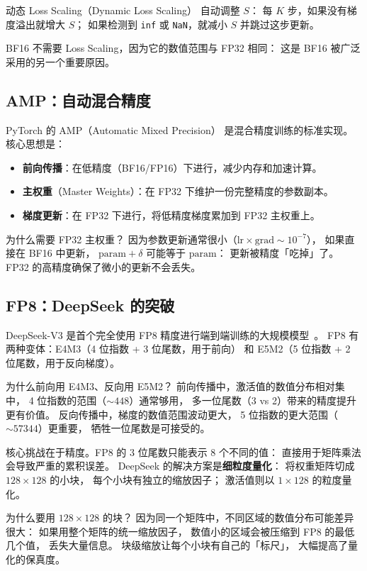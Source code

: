 动态 Loss Scaling（Dynamic Loss Scaling）
自动调整 $S$：
每 $K$ 步，如果没有梯度溢出就增大 $S$；
如果检测到 \texttt{inf} 或 \texttt{NaN}，就减小 $S$ 并跳过这步更新。

BF16 不需要 Loss Scaling，因为它的数值范围与 FP32 相同：
这是 BF16 被广泛采用的另一个重要原因。

\subsection{AMP：自动混合精度}

PyTorch 的 AMP（Automatic Mixed Precision）
是混合精度训练的标准实现。
核心思想是：
\begin{itemize}[noitemsep]
  \item \textbf{前向传播}：在低精度（BF16/FP16）下进行，减少内存和加速计算。
  \item \textbf{主权重}（Master Weights）：在 FP32 下维护一份完整精度的参数副本。
  \item \textbf{梯度更新}：在 FP32 下进行，将低精度梯度累加到 FP32 主权重上。
\end{itemize}

为什么需要 FP32 主权重？
因为参数更新通常很小（$\mathrm{lr} \times \mathrm{grad} \sim 10^{-7}$），
如果直接在 BF16 中更新，
$\mathrm{param} + \delta$ 可能等于 $\mathrm{param}$：
更新被精度「吃掉」了。
FP32 的高精度确保了微小的更新不会丢失。

\subsection{FP8：DeepSeek 的突破}

DeepSeek-V3 是首个完全使用 FP8 精度进行端到端训练的大规模模型~\cite{deepseekv3}。
FP8 有两种变体：E4M3（4 位指数 + 3 位尾数，用于前向）
和 E5M2（5 位指数 + 2 位尾数，用于反向梯度）。

为什么前向用 E4M3、反向用 E5M2？
前向传播中，激活值的数值分布相对集中，
4 位指数的范围（$\sim 448$）通常够用，
多一位尾数（3 vs 2）带来的精度提升更有价值。
反向传播中，梯度的数值范围波动更大，
5 位指数的更大范围（$\sim 57344$）更重要，
牺牲一位尾数是可接受的。

核心挑战在于精度。FP8 的 3 位尾数只能表示 8 个不同的值：
直接用于矩阵乘法会导致严重的累积误差。
DeepSeek 的解决方案是\textbf{细粒度量化}：
将权重矩阵切成 $128 \times 128$ 的小块，
每个小块有独立的缩放因子；
激活值则以 $1 \times 128$ 的粒度量化。

为什么要用 $128 \times 128$ 的块？
因为同一个矩阵中，不同区域的数值分布可能差异很大：
如果用整个矩阵的统一缩放因子，
数值小的区域会被压缩到 FP8 的最低几个值，
丢失大量信息。
块级缩放让每个小块有自己的「标尺」，
大幅提高了量化的保真度。

